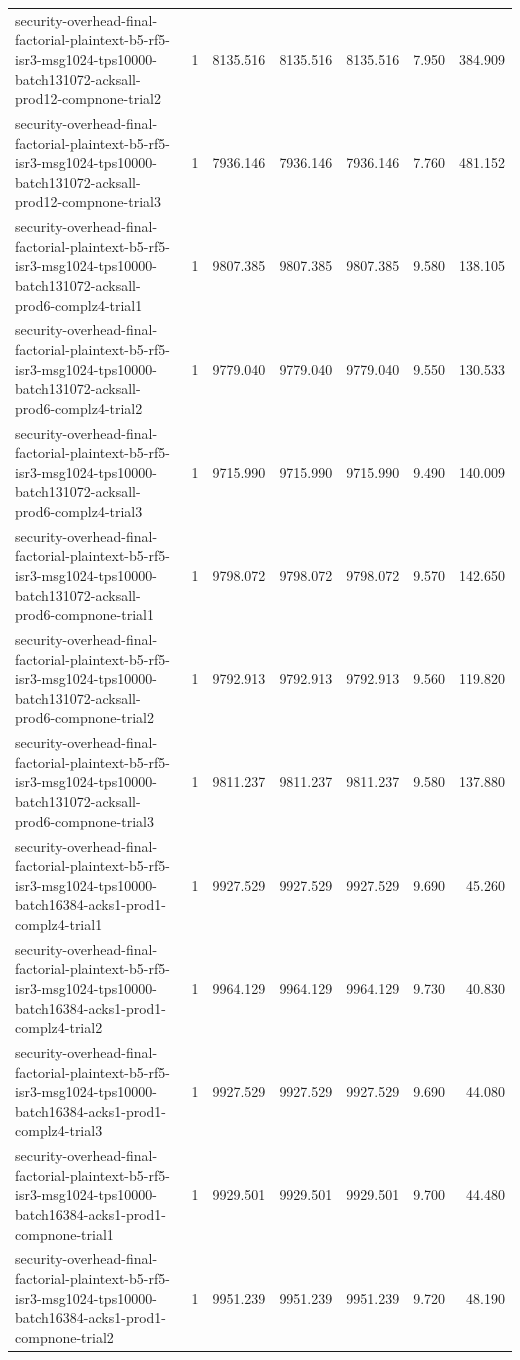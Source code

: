 \begin{tabular}{lrrrrrr}
security-overhead-final-factorial-plaintext-b5-rf5-isr3-msg1024-tps10000-batch131072-acksall-prod12-compnone-trial2 & 1 & 8135.516 & 8135.516 & 8135.516 & 7.950 & 384.909 \\
security-overhead-final-factorial-plaintext-b5-rf5-isr3-msg1024-tps10000-batch131072-acksall-prod12-compnone-trial3 & 1 & 7936.146 & 7936.146 & 7936.146 & 7.760 & 481.152 \\
security-overhead-final-factorial-plaintext-b5-rf5-isr3-msg1024-tps10000-batch131072-acksall-prod6-complz4-trial1 & 1 & 9807.385 & 9807.385 & 9807.385 & 9.580 & 138.105 \\
security-overhead-final-factorial-plaintext-b5-rf5-isr3-msg1024-tps10000-batch131072-acksall-prod6-complz4-trial2 & 1 & 9779.040 & 9779.040 & 9779.040 & 9.550 & 130.533 \\
security-overhead-final-factorial-plaintext-b5-rf5-isr3-msg1024-tps10000-batch131072-acksall-prod6-complz4-trial3 & 1 & 9715.990 & 9715.990 & 9715.990 & 9.490 & 140.009 \\
security-overhead-final-factorial-plaintext-b5-rf5-isr3-msg1024-tps10000-batch131072-acksall-prod6-compnone-trial1 & 1 & 9798.072 & 9798.072 & 9798.072 & 9.570 & 142.650 \\
security-overhead-final-factorial-plaintext-b5-rf5-isr3-msg1024-tps10000-batch131072-acksall-prod6-compnone-trial2 & 1 & 9792.913 & 9792.913 & 9792.913 & 9.560 & 119.820 \\
security-overhead-final-factorial-plaintext-b5-rf5-isr3-msg1024-tps10000-batch131072-acksall-prod6-compnone-trial3 & 1 & 9811.237 & 9811.237 & 9811.237 & 9.580 & 137.880 \\
security-overhead-final-factorial-plaintext-b5-rf5-isr3-msg1024-tps10000-batch16384-acks1-prod1-complz4-trial1 & 1 & 9927.529 & 9927.529 & 9927.529 & 9.690 & 45.260 \\
security-overhead-final-factorial-plaintext-b5-rf5-isr3-msg1024-tps10000-batch16384-acks1-prod1-complz4-trial2 & 1 & 9964.129 & 9964.129 & 9964.129 & 9.730 & 40.830 \\
security-overhead-final-factorial-plaintext-b5-rf5-isr3-msg1024-tps10000-batch16384-acks1-prod1-complz4-trial3 & 1 & 9927.529 & 9927.529 & 9927.529 & 9.690 & 44.080 \\
security-overhead-final-factorial-plaintext-b5-rf5-isr3-msg1024-tps10000-batch16384-acks1-prod1-compnone-trial1 & 1 & 9929.501 & 9929.501 & 9929.501 & 9.700 & 44.480 \\
security-overhead-final-factorial-plaintext-b5-rf5-isr3-msg1024-tps10000-batch16384-acks1-prod1-compnone-trial2 & 1 & 9951.239 & 9951.239 & 9951.239 & 9.720 & 48.190 \\

\end{tabular}
